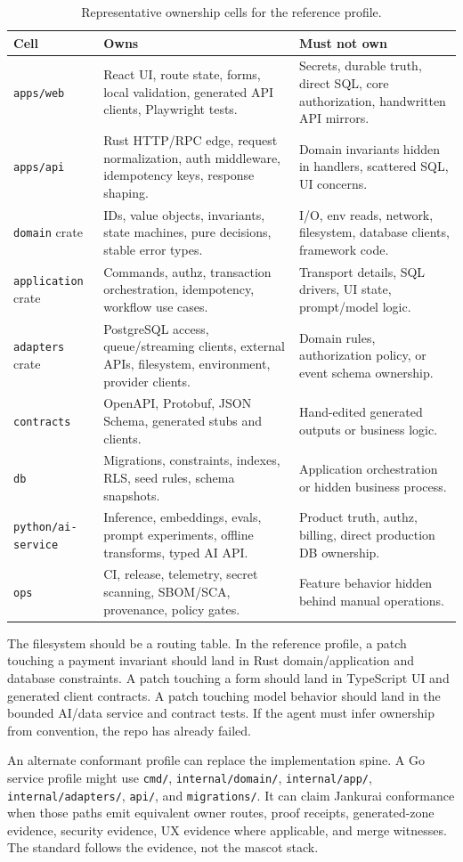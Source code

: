 \begin{table}[t]
\caption{Representative ownership cells for the reference profile.}
\label{tab:ownership}
\centering
\small
\begin{tabularx}{\textwidth}{L{0.18\textwidth} Y Y}
\toprule
\textbf{Cell} & \textbf{Owns} & \textbf{Must not own} \\
\midrule
\texttt{apps/web} & React UI, route state, forms, local validation, generated API clients, Playwright tests. & Secrets, durable truth, direct SQL, core authorization, handwritten API mirrors. \\
\texttt{apps/api} & Rust HTTP/RPC edge, request normalization, auth middleware, idempotency keys, response shaping. & Domain invariants hidden in handlers, scattered SQL, UI concerns. \\
\texttt{domain} crate & IDs, value objects, invariants, state machines, pure decisions, stable error types. & I/O, env reads, network, filesystem, database clients, framework code. \\
\texttt{application} crate & Commands, authz, transaction orchestration, idempotency, workflow use cases. & Transport details, SQL drivers, UI state, prompt/model logic. \\
\texttt{adapters} crate & PostgreSQL access, queue/streaming clients, external APIs, filesystem, environment, provider clients. & Domain rules, authorization policy, or event schema ownership. \\
\texttt{contracts} & OpenAPI, Protobuf, JSON Schema, generated stubs and clients. & Hand-edited generated outputs or business logic. \\
\texttt{db} & Migrations, constraints, indexes, RLS, seed rules, schema snapshots. & Application orchestration or hidden business process. \\
\texttt{python/ai-service} & Inference, embeddings, evals, prompt experiments, offline transforms, typed AI API. & Product truth, authz, billing, direct production DB ownership. \\
\texttt{ops} & CI, release, telemetry, secret scanning, SBOM/SCA, provenance, policy gates. & Feature behavior hidden behind manual operations. \\
\bottomrule
\end{tabularx}
\end{table}

The filesystem should be a routing table. In the reference profile, a patch touching a payment invariant should land in Rust domain/application and database constraints. A patch touching a form should land in TypeScript UI and generated client contracts. A patch touching model behavior should land in the bounded AI/data service and contract tests. If the agent must infer ownership from convention, the repo has already failed.

An alternate conformant profile can replace the implementation spine. A Go service profile might use \texttt{cmd/}, \texttt{internal/domain/}, \texttt{internal/app/}, \texttt{internal/adapters/}, \texttt{api/}, and \texttt{migrations/}. It can claim Jankurai conformance when those paths emit equivalent owner routes, proof receipts, generated-zone evidence, security evidence, UX evidence where applicable, and merge witnesses. The standard follows the evidence, not the mascot stack.
